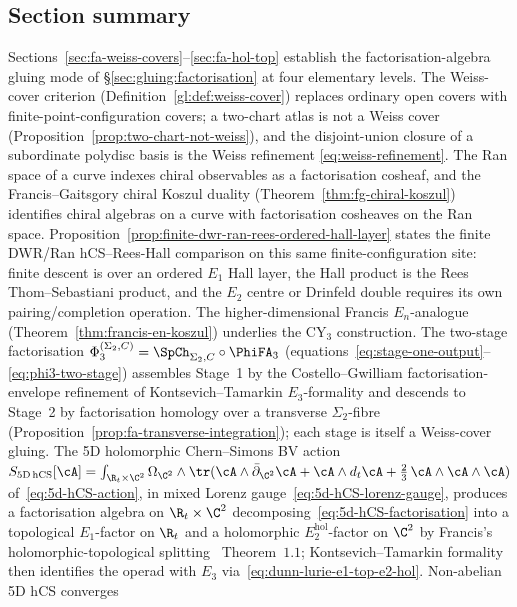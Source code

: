 \subsection{Section summary}

Sections~\ref{sec:fa-weiss-covers}--\ref{sec:fa-hol-top} establish the
factorisation-algebra gluing mode of \S\ref{sec:gluing:factorisation} at four elementary levels.
The Weiss-cover criterion (Definition~\ref{gl:def:weiss-cover}) replaces
ordinary open covers with finite-point-configuration covers; a
two-chart atlas is not a Weiss cover
(Proposition~\ref{prop:two-chart-not-weiss}), and the disjoint-union
closure of a subordinate polydisc basis is the Weiss refinement
\eqref{eq:weiss-refinement}. The Ran space of a curve indexes chiral
observables as a factorisation cosheaf, and the Francis--Gaitsgory
chiral Koszul duality (Theorem~\ref{thm:fg-chiral-koszul}) identifies
chiral algebras on a curve with factorisation cosheaves on the Ran
space. Proposition~\ref{prop:finite-dwr-ran-rees-ordered-hall-layer}
states the finite DWR/Ran hCS--Rees-Hall comparison on this same
finite-configuration site: finite descent is over an ordered $E_1$ Hall
layer, the Hall product is the Rees Thom--Sebastiani product, and the
$E_2$ centre or Drinfeld double requires its own pairing/completion
operation. The higher-dimensional Francis $E_n$-analogue
(Theorem~\ref{thm:francis-en-koszul}) underlies the CY$_3$ construction.
The two-stage factorisation $\Phi_3^{(\Sigma_2, C)} = \SpCh_{\Sigma_2, C} \circ
\PhiFA_3$ (equations~\eqref{eq:stage-one-output}--\eqref{eq:phi3-two-stage})
assembles Stage~1 by the Costello--Gwilliam factorisation-envelope
refinement of Kontsevich--Tamarkin $E_3$-formality and descends to
Stage~2 by factorisation homology over a transverse $\Sigma_2$-fibre
(Proposition~\ref{prop:fa-transverse-integration}); each stage is
itself a Weiss-cover gluing. The 5D holomorphic Chern--Simons BV action $S_{\mathrm{5D\,hCS}}[\cA]
= \int_{\R_t \times \C^2} \Omega_{\C^2} \wedge \tr(\cA \wedge
\bar\partial_{\C^2} \cA + \cA \wedge d_t \cA + \tfrac{2}{3}\, \cA
\wedge \cA \wedge \cA)$ of~\eqref{eq:5d-hCS-action}, in mixed Lorenz
gauge~\eqref{eq:5d-hCS-lorenz-gauge}, produces a factorisation algebra
on $\R_t \times \C^2$ decomposing~\eqref{eq:5d-hCS-factorisation}
into a topological $E_1$-factor on $\R_t$ and a holomorphic
$E_2^{\mathrm{hol}}$-factor on $\C^2$ by Francis's
holomorphic-topological splitting~\cite{Francis2013} Theorem~$1.1$;
Kontsevich--Tamarkin formality then identifies the operad with $E_3$
via~\eqref{eq:dunn-lurie-e1-top-e2-hol}. Non-abelian 5D hCS converges
